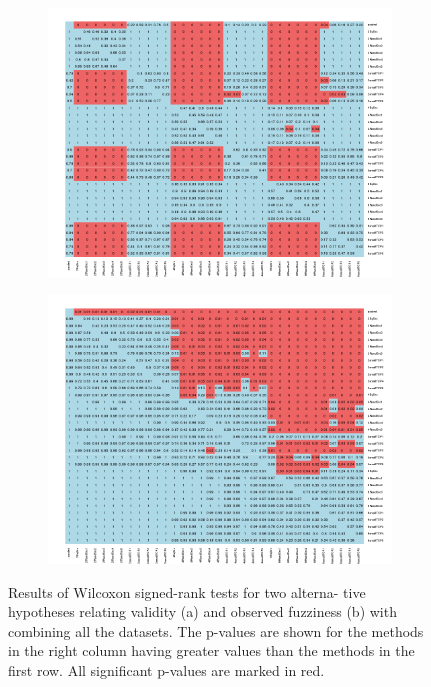 \documentclass[main]{subfiles}
\begin{document}
\begin{figure}[H]
\centering
\begin{subfigure}{\textwidth}
  \centering
  \includegraphics[width=.75\linewidth]{images/heatmapCombined}
\end{subfigure}%

\begin{subfigure}{\textwidth}
  \centering
  \includegraphics[width=.75\linewidth]{images/heatmapCombined_eff}
\end{subfigure}%
\caption{Results of Wilcoxon signed-rank tests for two alterna-
tive hypotheses relating validity (a) and observed fuzziness (b) with combining all the datasets. The p-values are shown for the methods in the right column having greater values than the methods in the first row. All significant p-values are marked in red.} \label{fig:testCombined}
\end{figure}
\end{document}
